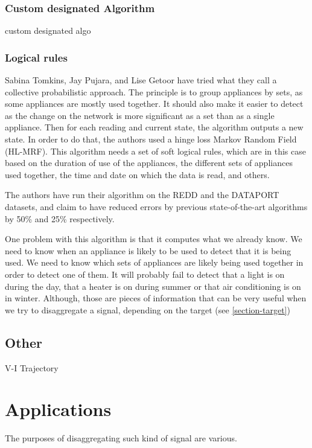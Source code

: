 \subsubsection{Custom designated Algorithm}
custom designated algo\cite{gupta2010electrisense}

\subsubsection{Logical rules}
Sabina Tomkins, Jay Pujara, and Lise Getoor have tried what they call a collective probabilistic approach\cite{tomkins2017disambiguating}. The principle is to group appliances by sets, as some appliances are mostly used together. It should also make it easier to detect as the change on the network is more significant as a set than as a single appliance. Then for each reading and current state, the algorithm outputs a new state. In order to do that, the authors used a hinge loss Markov Random Field (HL-MRF)\cite{bach2015hinge}. This algorithm needs a set of soft logical rules, which are in this case based on the duration of use of the appliances, the different sets of appliances used together, the time and date on which the data is read, and others.

The authors have run their algorithm on the REDD and the DATAPORT datasets, and claim to have reduced errors by previous state-of-the-art algorithms by 50\% and 25\% respectively.

One problem with this algorithm is that it computes what we already know. We need to know when an appliance is likely to be used to detect that it is being used. We need to know which sets of appliances are likely being used together in order to detect one of them. It will probably fail to detect that a light is on during the day, that a heater is on during summer or that air conditioning is on in winter. Although, those are pieces of information that can be very useful when we try to disaggregate a signal, depending on the target (see \autoref{section-target})


\subsection{Other}\label{section-vi}
V-I Trajectory\cite{hassan2014empirical} \cite{lam2007novel}  %

\cite{do2016applications}%


\section{Applications}\label{section-application}
The purposes of disaggregating such kind of signal are various.

